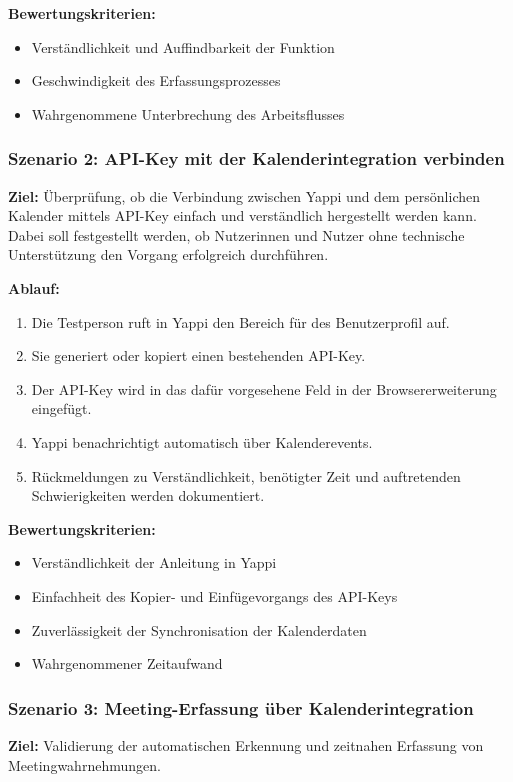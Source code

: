 \documentclass[12pt,a4paper]{report}
\begin{document}
    \textbf{Bewertungskriterien:}
    \begin{itemize}
        \item Verständlichkeit und Auffindbarkeit der Funktion
        \item Geschwindigkeit des Erfassungsprozesses
        \item Wahrgenommene Unterbrechung des Arbeitsflusses
    \end{itemize}

    \subsubsection{Szenario 2: API-Key mit der Kalenderintegration verbinden}
    \textbf{Ziel:} Überprüfung, ob die Verbindung zwischen Yappi und dem persönlichen Kalender mittels API-Key einfach
    und verständlich hergestellt werden kann. Dabei soll festgestellt werden, ob Nutzerinnen und Nutzer ohne technische
    Unterstützung den Vorgang erfolgreich durchführen.

    \textbf{Ablauf:}
    \begin{enumerate}
        \item Die Testperson ruft in Yappi den Bereich für des Benutzerprofil auf.
        \item Sie generiert oder kopiert einen bestehenden API-Key.
        \item Der API-Key wird in das dafür vorgesehene Feld in der Browsererweiterung eingefügt.
        \item Yappi benachrichtigt automatisch über Kalenderevents.
        \item Rückmeldungen zu Verständlichkeit, benötigter Zeit und auftretenden Schwierigkeiten werden dokumentiert.
    \end{enumerate}

    \textbf{Bewertungskriterien:}
    \begin{itemize}
        \item Verständlichkeit der Anleitung in Yappi
        \item Einfachheit des Kopier- und Einfügevorgangs des API-Keys
        \item Zuverlässigkeit der Synchronisation der Kalenderdaten
        \item Wahrgenommener Zeitaufwand
    \end{itemize}

    \subsubsection{Szenario 3: Meeting-Erfassung über Kalenderintegration}
    \textbf{Ziel:} Validierung der automatischen Erkennung und zeitnahen Erfassung von Meetingwahrnehmungen.
\end{document}
